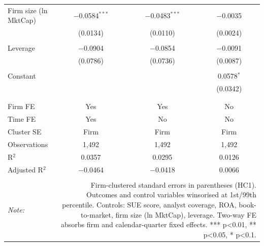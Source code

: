 \begin{table}[!htbp]
\begin{tabular}{@{\extracolsep{5pt}}lccc}
 Firm size (ln MktCap) & $-$0.0584$^{***}$ & $-$0.0483$^{***}$ & $-$0.0035 \\ 
  & (0.0134) & (0.0110) & (0.0024) \\ 
  & & & \\ 
 Leverage & $-$0.0904 & $-$0.0854 & $-$0.0091 \\ 
  & (0.0786) & (0.0736) & (0.0087) \\ 
  & & & \\ 
 Constant &  &  & 0.0578$^{*}$ \\ 
  &  &  & (0.0342) \\ 
  & & & \\ 
\hline \\[-1.8ex] 
Firm FE & Yes & Yes & No \\ 
Time FE & Yes & No & No \\ 
Cluster SE & Firm & Firm & Firm \\ 
Observations & 1,492 & 1,492 & 1,492 \\ 
R$^{2}$ & 0.0357 & 0.0295 & 0.0126 \\ 
Adjusted R$^{2}$ & $-$0.0464 & $-$0.0418 & 0.0066 \\ 
\hline 
\hline \\[-1.8ex] 
\textit{Note:}  & \multicolumn{3}{r}{Firm-clustered standard errors in parentheses (HC1). Outcomes and control variables winsorised at 1st/99th percentile. Controls: SUE score, analyst coverage, ROA, book-to-market, firm size (ln MktCap), leverage. Two-way FE absorbs firm and calendar-quarter fixed effects. *** p<0.01, ** p<0.05, * p<0.1.} \\ 
\end{tabular} 
\end{table} 
